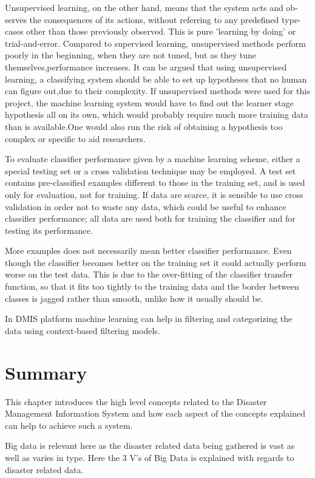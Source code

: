 Unsupervised learning, on the other hand, means that the system acts and ob-serves the consequences of its actions, without referring to any predefined type-cases other than those previously observed. This is pure 'learning by doing' or trial-and-error. Compared to supervised learning, unsupervised methods perform poorly in the beginning, when they are not tuned, but as they tune themselves,performance increases. It can be argued that using unsupervised learning, a classifying system should be able to set up hypotheses that no human can figure out,due to their complexity. If unsupervised methods were used for this project, the machine learning system would have to find out the learner stage hypothesis all on its own, which would probably require much more training data than is available.One would also run the risk of obtaining a hypothesis too complex or specific to aid researchers.

To evaluate classifier performance given by a machine learning scheme, either a special testing set or a cross validation technique may be employed. A test set contains pre-classified examples different to those in the training set, and is used only for evaluation, not for training. If data are scarce, it is sensible to use cross validation in order not to waste any data, which could be useful to enhance classifier performance; all data are used both for training the classifier and for testing its performance.

More examples does not necessarily mean better classifier performance. Even though the classifier becomes better on the training set it could actually perform worse on the test data. This is due to the over-fitting of the classifier transfer function, so that it fits too tightly to the training data and the border between classes is jagged rather than smooth, unlike how it usually should be.

In DMIS platform machine learning can help in filtering and categorizing the data using context-based filtering models.

\section{Summary}

This chapter introduces the high level concepts related to the Disaster Management Information System and how each aspect of the concepts explained can help to achieve such a system.

Big data is relevant here as the disaster related data being gathered is vast as well as varies in type. Here the 3 V's of Big Data is explained with regards to disaster related data. 

